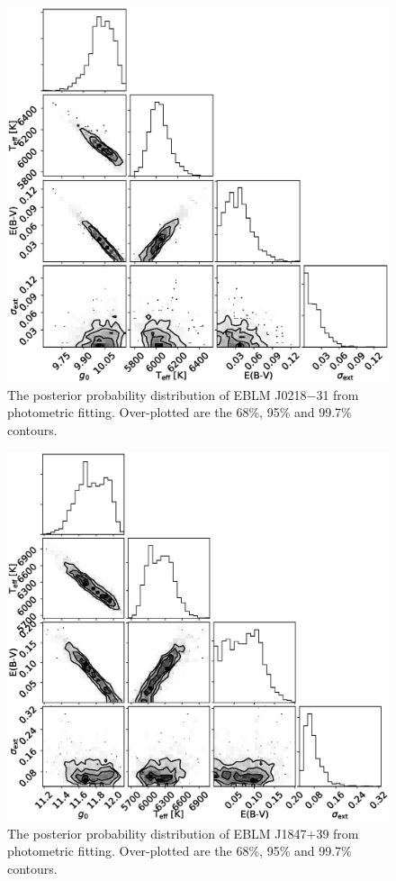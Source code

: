 \begin{figure}
    \centering
    \includegraphics[scale=0.5]{Appendix/SED_fits/J0218-31.eps}
    \caption{The posterior probability distribution of EBLM J0218$-$31 from photometric fitting. Over-plotted are the 68\%, 95\% and 99.7\% contours.}
    \label{methods:fig:SED_J0218-31}
\end{figure}

\begin{figure}
    \centering
    \includegraphics[scale=0.5]{Appendix/SED_fits/J1847+39.eps}
    \caption{The posterior probability distribution of EBLM J1847$+$39 from photometric fitting. Over-plotted are the 68\%, 95\% and 99.7\% contours.}
    \label{methods:fig:SED_J1847+39}
\end{figure}

